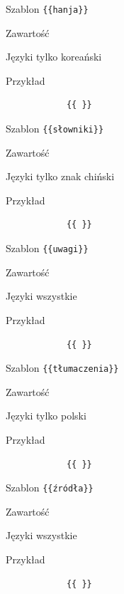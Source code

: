 \documentclass{pracamgr}
\newcommand{\spacer}{
	\begin{center}
		\textasteriskcentered
	\end{center}
}
\newenvironment{description-sub}[0]{
	\begin{basedescript}{\desclabelstyle{\pushlabel}\desclabelwidth{6em}}\setlength{\itemsep}{-2mm}
}{
	\end{basedescript}
}
\begin{document}
\spacer
\begin{description-sub}
	\item[Szablon] \verb|{{hanja}}|
	\item[Zawartość]
	\item[Języki] tylko koreański
	\item[Przykład]
		\begin{verbatim}
			{{ }}
		\end{verbatim}
\end{description-sub}
\spacer
\begin{description-sub}
	\item[Szablon] \verb|{{słowniki}}|
	\item[Zawartość]
	\item[Języki] tylko znak chiński
	\item[Przykład]
		\begin{verbatim}
			{{ }}
		\end{verbatim}
\end{description-sub}
\spacer
\begin{description-sub}
	\item[Szablon] \verb|{{uwagi}}|
	\item[Zawartość]
	\item[Języki] wszystkie
	\item[Przykład]
		\begin{verbatim}
			{{ }}
		\end{verbatim}
\end{description-sub}
\spacer
\begin{description-sub}
	\item[Szablon] \verb|{{tłumaczenia}}|
	\item[Zawartość]
	\item[Języki] tylko polski
	\item[Przykład]
		\begin{verbatim}
			{{ }}
		\end{verbatim}
\end{description-sub}
\spacer
\begin{description-sub}
	\item[Szablon] \verb|{{źródła}}|
	\item[Zawartość]
	\item[Języki] wszystkie
	\item[Przykład]
		\begin{verbatim}
			{{ }}
		\end{verbatim}
\end{description-sub}
\spacer
\end{document}

